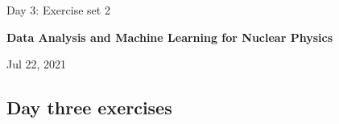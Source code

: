 \documentclass[%
oneside,                 %
final,                   %
10pt]{article}
\begin{document}

\newcommand{\exercisesection}[1]{\subsection*{#1}}






\thispagestyle{empty}

\begin{center}
{\LARGE\bf
\begin{spacing}{1.25}
Day 3: Exercise set 2
\end{spacing}
}
\end{center}


\begin{center}
{\bf Data Analysis and Machine Learning for Nuclear Physics${}^{}$} \\ [0mm]
\end{center}

\begin{center}
\end{center}
    

\begin{center}
Jul 22, 2021
\end{center}

\vspace{1cm}


\subsection*{Day three exercises}
\end{document}
